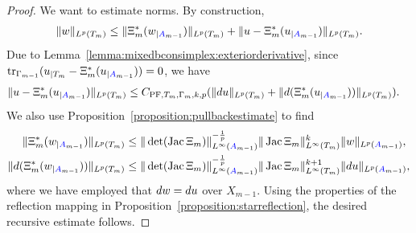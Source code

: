 \documentclass[10pt,a4paper]{article}
\begin{document}
\begin{proof}
    We want to estimate norms. 
    By construction,
    \begin{align*}
        \| w \|_{L^{p}(T_{m})}
        \leq  
        \| \Xi_{m}^{\ast}(w_{|{\color{blue}A}_{m-1}}) \|_{L^{p}(T_{m})}
        + 
        \| u - \Xi_{m}^{\ast}(u_{|{\color{blue}A}_{m-1}}) \|_{L^{p}(T_{m})}
        .
    \end{align*}
    Due to Lemma~\ref{lemma:mixedbconsimplex:exteriorderivative}, since $\operatorname{tr}_{\Gamma_{m-1}} (u_{|T_m} - \Xi_{m}^{\ast}(u_{|{\color{blue}A}_{m-1}})) = 0$, we have
    \begin{align*}
        \| u - \Xi_{m}^{\ast}(u_{|{\color{blue}A}_{m-1}}) \|_{L^{p}(T_{m})} 
        &
        \leq 
        C_{{\rm PF},T_{m},\Gamma_{m},k,p} (\| d u      \|_{L^{p}(T_{m})} 
        + \| d (\Xi_{m}^{\ast}(u_{|{\color{blue}A}_{m-1}})) \|_{L^{p}(T_{m})} )
        .
    \end{align*}
    We also use Proposition~\ref{proposition:pullbackestimate} to find 
    \begin{align*}
        \| \Xi_{m}^{\ast}(w_{|{\color{blue}A}_{m-1}}) \|_{L^{p}(T_{m})}
        &\leq 
        \|\det(\operatorname{{\rm Jac}} \Xi_{m}  )\|^{-\frac 1 p}_{L^{\infty}({\color{blue}A}_{m-1})} 
        \| \operatorname{{\rm Jac}} \Xi_{m} \|^{k}_{L^{\infty}(T_{m})}
        \| w \|_{L^{p}({\color{blue}A}_{m-1})}
        ,
        \\
        \| d (\Xi_{m}^{\ast}(w_{|{\color{blue}A}_{m-1}})) \|_{L^{p}(T_{m})}
        &\leq 
        \|\det(\operatorname{{\rm Jac}} \Xi_{m}  )\|^{-\frac 1 p}_{L^{\infty}({\color{blue}A}_{m-1})} 
        \| \operatorname{{\rm Jac}} \Xi_{m} \|^{k+1}_{L^{\infty}(T_{m})}
        \| d u \|_{L^{p}({\color{blue}A}_{m-1})}
        ,
    \end{align*}
    where we have employed that $d w = d u$ over $X_{m-1}$. 
    Using the properties of the reflection mapping in Proposition~\ref{proposition:starreflection}, the desired recursive estimate follows. 
\end{proof}
\end{document}

